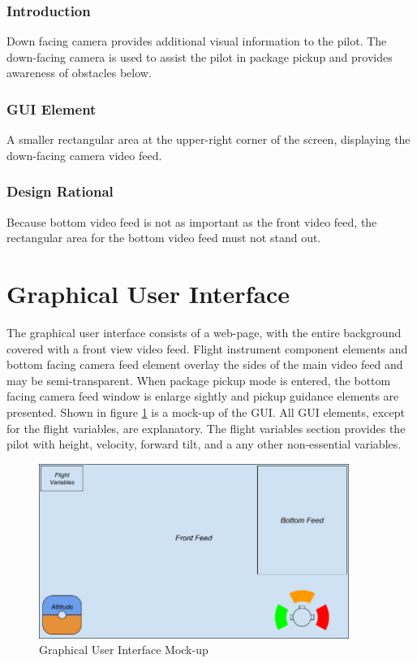\documentclass[onecolumn, oneside, letterpaper, draftclsnofoot, 10pt, compsoc]{IEEEtran}
\begin{document}
\subsubsection{Introduction}
Down facing camera provides additional visual information to the pilot. The down-facing camera is used to assist the pilot in package pickup and provides awareness of obstacles below.

\subsubsection{GUI Element}
A smaller rectangular area at the upper-right corner of the screen, displaying the down-facing camera video feed.

\subsubsection{Design Rational}
Because bottom video feed is not as important as the front video feed, the rectangular area for the bottom video feed must not stand out.

\section{Graphical User Interface}
The graphical user interface consists of a web-page, with the entire background covered with a front view video feed. Flight instrument component elements and bottom facing camera feed element overlay the sides of the main video feed and may be semi-transparent. When package pickup mode is entered, the bottom facing camera feed window is enlarge sightly and pickup guidance elements are presented. Shown in figure \ref{fig:UI1} is a mock-up of the GUI. All GUI elements, except for the flight variables, are explanatory. The flight variables section provides the pilot with height, velocity, forward tilt, and a any other non-essential variables.

\begin{figure}[h]
    \centering
    \includegraphics[width=0.9\textwidth]{graphics/ui1.png}
    \caption{Graphical User Interface Mock-up}
    \label{fig:UI1}
\end{figure}
\end{document}
